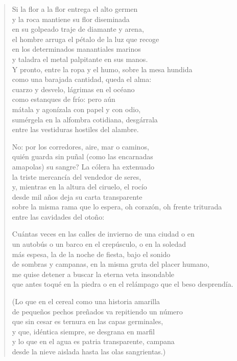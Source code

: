 \documentclass[12pt]{article}
\begin{document}
\begin{verse}
Si la flor a la flor entrega el alto germen\\
y la roca mantiene su flor diseminada\\
en su golpeado traje de diamante y arena,\\
el hombre arruga el pétalo de la luz que recoge\\
en los determinados manantiales marinos\\
y taladra el metal palpitante en sus manos.\\
Y pronto, entre la ropa y el humo, sobre la mesa hundida\\
como una barajada cantidad, queda el alma:\\
cuarzo y desvelo, lágrimas en el océano\\
como estanques de frío: pero aún\\
mátala y agonízala con papel y con odio,\\
sumérgela en la alfombra cotidiana, desgárrala\\
entre las vestiduras hostiles del alambre.  

No: por los corredores, aire, mar o caminos,\\
quién guarda sin puñal (como las encarnadas\\
amapolas) su sangre? La cólera ha extenuado\\
la triste mercancía del vendedor de seres,\\
y, mientras en la altura del ciruelo, el rocío\\
desde mil años deja su carta transparente\\
sobre la misma rama que lo espera, oh corazón, oh frente triturada\\
entre las cavidades del otoño:  

Cuántas veces en las calles de invierno de una ciudad o en\\
un autobús o un barco en el crepúsculo, o en la soledad\\
más espesa, la de la noche de fiesta, bajo el sonido\\
de sombras y campanas, en la misma gruta del placer humano,\\
me quise detener a buscar la eterna veta insondable\\
que antes toqué en la piedra o en el relámpago que el beso desprendía.  

(Lo que en el cereal como una historia amarilla\\
de pequeños pechos preñados va repitiendo un número\\
que sin cesar es ternura en las capas germinales,\\
y que, idéntica siempre, se desgrana en marfil\\
y lo que en el agua es patria transparente, campana\\
desde la nieve aislada hasta las olas sangrientas.)  


\end{verse}
\end{document}

